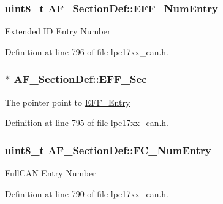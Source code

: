 \hypertarget{struct_a_f___section_def_aecd324d629216a0982cee2fa2234f58f}{
\subsubsection[{\-E\-F\-F\-\_\-\-Num\-Entry}]{\setlength{\rightskip}{0pt plus 5cm}uint8\-\_\-t {\bf \-A\-F\-\_\-\-Section\-Def\-::\-E\-F\-F\-\_\-\-Num\-Entry}}}\label{struct_a_f___section_def_aecd324d629216a0982cee2fa2234f58f}
\-Extended \-I\-D \-Entry \-Number 

\-Definition at line 796 of file lpc17xx\-\_\-can.\-h.

\hypertarget{struct_a_f___section_def_a4b569040ad424cfa22f56cbdb92c9f75}{
\subsubsection[{\-E\-F\-F\-\_\-\-Sec}]{$\ast$ {\bf \-A\-F\-\_\-\-Section\-Def\-::\-E\-F\-F\-\_\-\-Sec}}}\label{struct_a_f___section_def_a4b569040ad424cfa22f56cbdb92c9f75}
\-The pointer point to \hyperlink{struct_e_f_f___entry}{\-E\-F\-F\-\_\-\-Entry} 

\-Definition at line 795 of file lpc17xx\-\_\-can.\-h.

\hypertarget{struct_a_f___section_def_a61c32cba35b74d65bf6585c95221322b}{
\subsubsection[{\-F\-C\-\_\-\-Num\-Entry}]{\setlength{\rightskip}{0pt plus 5cm}uint8\-\_\-t {\bf \-A\-F\-\_\-\-Section\-Def\-::\-F\-C\-\_\-\-Num\-Entry}}}\label{struct_a_f___section_def_a61c32cba35b74d65bf6585c95221322b}
\-Full\-C\-A\-N \-Entry \-Number 

\-Definition at line 790 of file lpc17xx\-\_\-can.\-h.

